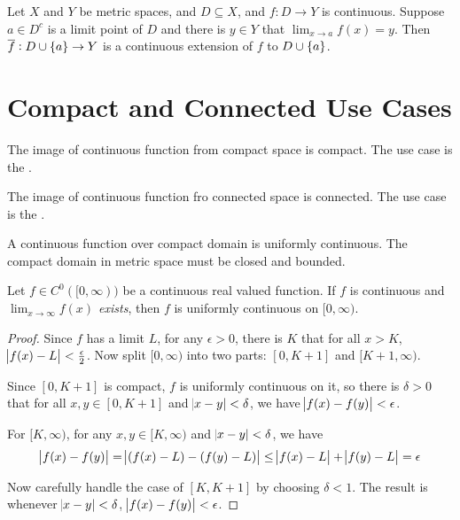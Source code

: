 \begin{theorem}
    Let $X$ and $Y$ be metric spaces, and $D \subseteq X$, and $f: D\rightarrow Y$ is continuous. Suppose $a \in D^c$ is a limit point of $D$ and there is $y \in Y$ that $\lim_{x \rightarrow a} f(x) = y$. Then $\overline{f}: D \cup \set{a} \rightarrow Y$ is a continuous extension of $f$ to $D \cup \set{a}$.
\end{theorem}



\section{Compact and Connected Use Cases}

\begin{theorem}
    The image of continuous function from compact space is compact. The use case is the .
\end{theorem}

\begin{theorem}
    The image of continuous function fro connected space is connected. The use case is the .
\end{theorem}

\begin{theorem}
    A continuous function over compact domain is uniformly continuous. The compact domain in metric space must be closed and bounded.
\end{theorem}

\begin{theorem}
    Let $f \in C^0([0,\infty))$ be a continuous real valued function. If $f$ is continuous and \emph{$\displaystyle \lim_{x\rightarrow \infty} f(x)$ exists}, then $f$ is uniformly continuous on $[0, \infty)$.
\end{theorem}
\begin{proof}
    Since $f$ has a limit $L$, for any $\epsilon > 0$, there is $K$ that for all $x > K$, $\abs{f(x) - L} < \frac{\epsilon}{2}$. Now split $[0, \infty)$ into two parts: $[0, K+1]$ and $[K+1, \infty)$.
    
    Since $[0, K+1]$ is compact, $f$ is uniformly continuous on it, so there is $\delta>0$ that for all $x,y \in [0,K+1]$ and $\abs{x-y} < \delta$, we have $\abs{f(x) - f(y)} < \epsilon$.
    
    For $[K, \infty)$, for any $x,y \in [K, \infty)$ and $\abs{x - y} < \delta$, we have
    \begin{equation*}
        \abs{f(x) - f(y)} = \abs{(f(x) - L) - (f(y) - L)} \leq \abs{f(x) - L} + \abs{f(y) - L} = \epsilon
    \end{equation*}
    
    Now carefully handle the case of $[K, K+1]$ by choosing $\delta < 1$. The result is whenever $\abs{x - y } < \delta$, $\abs{f(x) - f(y)} < \epsilon$.
\end{proof}

